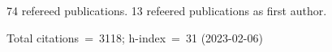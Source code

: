 74 refereed publications. 13 refeered publications as first author.

Total citations~=~3118; h-index~=~31 (2023-02-06)